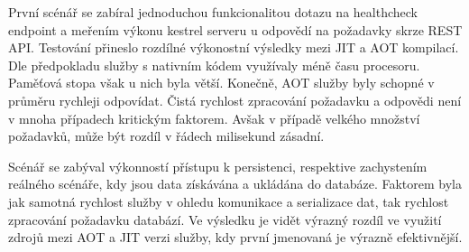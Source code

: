 
První scénář se zabíral jednoduchou funkcionalitou dotazu na healthcheck endpoint a meřením výkonu kestrel serveru u odpovědí na požadavky skrze REST API. Testování přineslo rozdílné výkonostní výsledky mezi JIT a AOT kompilací. Dle předpokladu služby s nativním kódem využívaly méně času procesoru. Paměťová stopa však u nich byla větší. Konečně, AOT služby byly schopné v průměru rychleji odpovídat. Čistá rychlost zpracování požadavku a odpovědi není v mnoha případech kritickým faktorem. Avšak v případě velkého množství požadavků, může být rozdíl v řádech milisekund zásadní.



Scénář se zabýval výkonností přístupu k persistenci, respektive zachystením reálného scénáře, kdy jsou data získávána a ukládána do databáze. Faktorem byla jak samotná rychlost služby v ohledu komunikace a serializace dat, tak rychlost zpracování požadavku databází. Ve výsledku je vidět výrazný rozdíl ve využití zdrojů mezi AOT a JIT verzi služby, kdy první jmenovaná je výrazně efektivnější.


